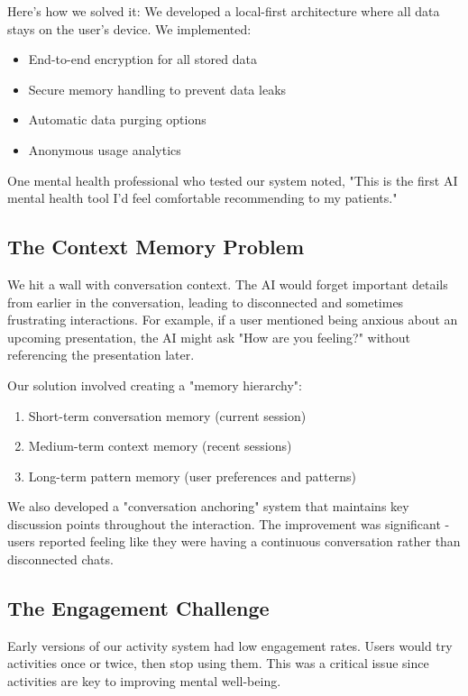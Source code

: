 \documentclass[12pt]{article}
\begin{document}
Here's how we solved it:
We developed a local-first architecture where all data stays on the user's device. We implemented:
\begin{itemize}
    \item End-to-end encryption for all stored data
    \item Secure memory handling to prevent data leaks
    \item Automatic data purging options
    \item Anonymous usage analytics
\end{itemize}

One mental health professional who tested our system noted, "This is the first AI mental health tool I'd feel comfortable recommending to my patients."

\subsection{The Context Memory Problem}
We hit a wall with conversation context. The AI would forget important details from earlier in the conversation, leading to disconnected and sometimes frustrating interactions. For example, if a user mentioned being anxious about an upcoming presentation, the AI might ask "How are you feeling?" without referencing the presentation later.

Our solution involved creating a "memory hierarchy":
\begin{enumerate}
    \item Short-term conversation memory (current session)
    \item Medium-term context memory (recent sessions)
    \item Long-term pattern memory (user preferences and patterns)
\end{enumerate}

We also developed a "conversation anchoring" system that maintains key discussion points throughout the interaction. The improvement was significant - users reported feeling like they were having a continuous conversation rather than disconnected chats.

\subsection{The Engagement Challenge}
Early versions of our activity system had low engagement rates. Users would try activities once or twice, then stop using them. This was a critical issue since activities are key to improving mental well-being.
\end{document}
